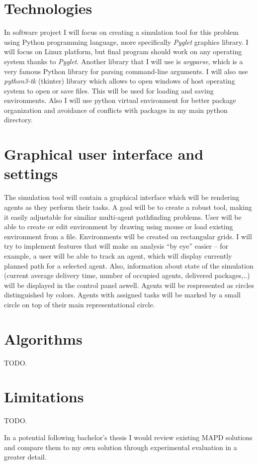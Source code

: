\section*{Technologies}
In software project I will focus on creating a simulation tool for this problem
using Python programming language, more specifically \textit{Pyglet} graphics
library. I will focus on Linux platform, but final program should work on any
operating system thanks to \textit{Pyglet}. Another library that I will use is
\textit{argparse}, which is a very famous Python library for parsing
command-line arguments. I will also use \textit{python3-tk} (tkinter) library
which allows to open windows of host operating system to open or save files.
This will be used for loading and saving environments. Also I will use python
virtual environment for better package organization and avoidance of conflicts
with packages in my main python directory.

\newpage
\section*{Graphical user interface and settings}
The simulation tool will contain a graphical interface which will be rendering 
agents as they perform their tasks. A goal will be to create a robust tool, making
it easily adjustable for similiar multi-agent pathfinding problems. User will be
able to create or edit environment by drawing using mouse or load existing
environment from a file. Environments will be created on rectangular grids.
I will try to implement features that will
make an analysis ``by eye'' easier -- for example, a user will be able to track an
agent, which will display currently planned path for a selected agent. Also,
information about state of the simulation (current average delivery time, 
number of occupied agents,
delivered packages,..) will be displayed in the control panel aswell.
Agents will be respresented as circles distinguished by colors.
Agents with assigned tasks will be marked by a small circle on top of their main
representational circle. 

\section*{Algorithms}
TODO.
\section*{Limitations}
TODO.


\vspace{5mm}\noindent In a potential following bachelor's thesis I would review
existing MAPD solutions and compare them to my own solution through experimental
evaluation in a greater detail.
